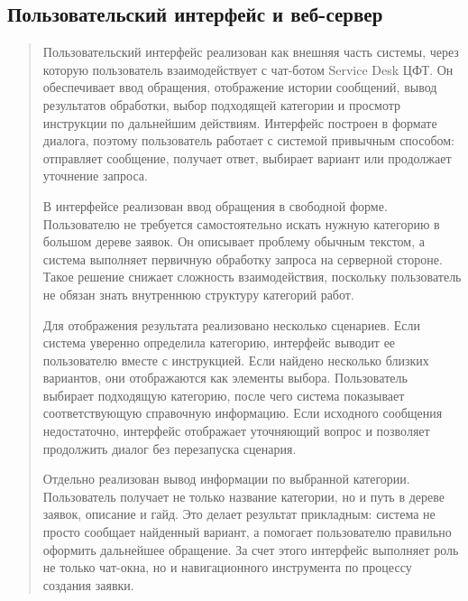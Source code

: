\documentclass[
]{article}
\begin{document}
\hypertarget{ux43fux43eux43bux44cux437ux43eux432ux430ux442ux435ux43bux44cux441ux43aux438ux439-ux438ux43dux442ux435ux440ux444ux435ux439ux441-ux438-ux432ux435ux431-ux441ux435ux440ux432ux435ux440}{%
\subsection{Пользовательский интерфейс и
веб-сервер}\label{ux43fux43eux43bux44cux437ux43eux432ux430ux442ux435ux43bux44cux441ux43aux438ux439-ux438ux43dux442ux435ux440ux444ux435ux439ux441-ux438-ux432ux435ux431-ux441ux435ux440ux432ux435ux440}}

\begin{quote}
Пользовательский интерфейс реализован как внешняя часть системы, через
которую пользователь взаимодействует с чат-ботом Service Desk ЦФТ. Он
обеспечивает ввод обращения, отображение истории сообщений, вывод
результатов обработки, выбор подходящей категории и просмотр инструкции
по дальнейшим действиям. Интерфейс построен в формате диалога, поэтому
пользователь работает с системой привычным способом: отправляет
сообщение, получает ответ, выбирает вариант или продолжает уточнение
запроса.

В интерфейсе реализован ввод обращения в свободной форме. Пользователю
не требуется самостоятельно искать нужную категорию в большом дереве
заявок. Он описывает проблему обычным текстом, а система выполняет
первичную обработку запроса на серверной стороне. Такое решение снижает
сложность взаимодействия, поскольку пользователь не обязан знать
внутреннюю структуру категорий работ.

Для отображения результата реализовано несколько сценариев. Если система
уверенно определила категорию, интерфейс выводит ее пользователю вместе
с инструкцией. Если найдено несколько близких вариантов, они
отображаются как элементы выбора. Пользователь выбирает подходящую
категорию, после чего система показывает соответствующую справочную
информацию. Если исходного сообщения недостаточно, интерфейс отображает
уточняющий вопрос и позволяет продолжить диалог без перезапуска
сценария.

Отдельно реализован вывод информации по выбранной категории.
Пользователь получает не только название категории, но и путь в дереве
заявок, описание и гайд. Это делает результат прикладным: система не
просто сообщает найденный вариант, а помогает пользователю правильно
оформить дальнейшее обращение. За счет этого интерфейс выполняет роль не
только чат-окна, но и навигационного инструмента по процессу создания
заявки.


\end{quote}
\end{document}
